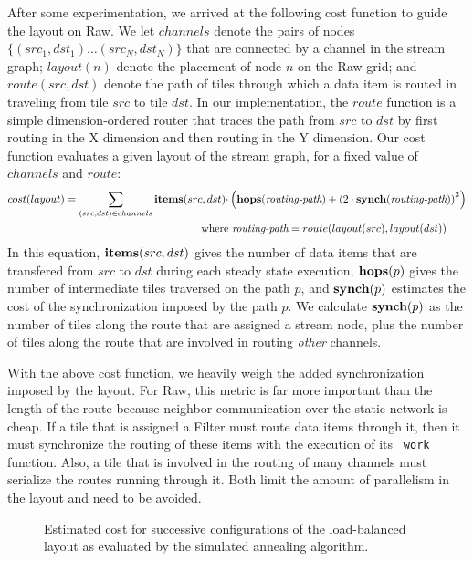 After some experimentation, we arrived at the following cost function
to guide the layout on Raw.  We let $channels$ denote the pairs of
nodes $\{(src_1, dst_1) \dots (src_N, dst_N)\}$ that are connected by
a channel in the stream graph; $layout(n)$ denote the placement of
node $n$ on the Raw grid; and $route(src, dst)$ denote the path of
tiles through which a data item is routed in traveling from tile $src$
to tile $dst$.  In our implementation, the $route$ function is a
simple dimension-ordered router that traces the path from $src$ to
$dst$ by first routing in the X dimension and then routing in the Y
dimension.  Our cost function evaluates a given layout of the stream
graph, for a fixed value of $channels$ and $route$:
\begin{align*}
cost(layout) = \sum _{(src,dst) \in channels} {\bf items}(src,dst)
\cdot & \left( {\bf hops}(\mbox{\it routing-path}) + \left( 2 \cdot
{\bf synch}(\mbox{\it routing-path}) \right) ^{3} \right) \\ \mbox{where} &~
\mbox{\it routing-path} = route(layout(src), layout(dst))
\end{align*}
In this equation, ${\bf items}(src, dst)$ gives the number of data
items that are transfered from $src$ to $dst$ during each steady state
execution, ${\bf hops}(p)$ gives the number of intermediate tiles
traversed on the path $p$, and ${\bf synch}(p)$ estimates the cost of
the synchronization imposed by the path $p$.  We calculate ${\bf
synch}(p)$ as the number of tiles along the route that are assigned a
stream node, plus the number of tiles along the route that are
involved in routing {\it other} channels.

With the above cost function, we heavily weigh the added
synchronization imposed by the layout.  For Raw, this metric is far
more important than the length of the route because neighbor
communication over the static network is cheap.  If a tile that is
assigned a Filter must route data items through it, then it must
synchronize the routing of these items with the execution of its {\tt
work} function.  Also, a tile that is involved in the routing of many
channels must serialize the routes running through it.  Both limit the
amount of parallelism in the layout and need to be avoided.

\begin{figure}
\centering
{}
\parbox{4in}{\caption{\protect\small Estimated cost for successive
configurations of the load-balanced \BeamFormer layout as evaluated by
the simulated annealing algorithm. \protect\label{fig:anneal-cost}}}
\end{figure}

